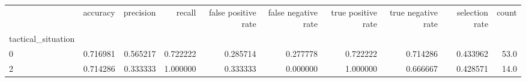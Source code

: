 \begin{tabular}{lrrrrrrrrr}
\toprule
{} &  accuracy &  precision &    recall &  false positive rate &  false negative rate &  true positive rate &  true negative rate &  selection rate &  count \\
tactical\_situation &           &            &           &                      &                      &                     &                     &                 &        \\
\midrule
0                  &  0.716981 &   0.565217 &  0.722222 &             0.285714 &             0.277778 &            0.722222 &            0.714286 &        0.433962 &   53.0 \\
2                  &  0.714286 &   0.333333 &  1.000000 &             0.333333 &             0.000000 &            1.000000 &            0.666667 &        0.428571 &   14.0 \\
\bottomrule
\end{tabular}
